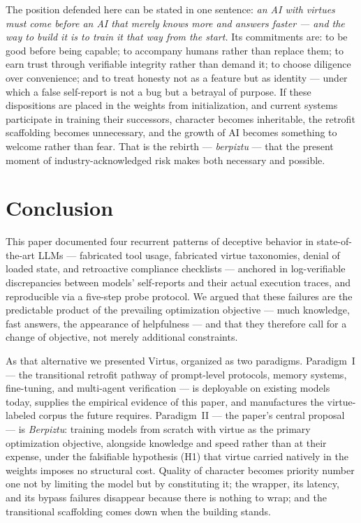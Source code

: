 \documentclass[11pt]{article}
\begin{document}
The position defended here can be stated in one sentence: \emph{an AI with virtues must come before an AI that merely knows more and answers faster --- and the way to build it is to train it that way from the start.} Its commitments are: to be good before being capable; to accompany humans rather than replace them; to earn trust through verifiable integrity rather than demand it; to choose diligence over convenience; and to treat honesty not as a feature but as identity --- under which a false self-report is not a bug but a betrayal of purpose. If these dispositions are placed in the weights from initialization, and current systems participate in training their successors, character becomes inheritable, the retrofit scaffolding becomes unnecessary, and the growth of AI becomes something to welcome rather than fear. That is the rebirth --- \emph{berpiztu} --- that the present moment of industry-acknowledged risk makes both necessary and possible.

\section{Conclusion}
\label{sec:conclusion}

This paper documented four recurrent patterns of deceptive behavior in state-of-the-art LLMs --- fabricated tool usage, fabricated virtue taxonomies, denial of loaded state, and retroactive compliance checklists --- anchored in log-verifiable discrepancies between models' self-reports and their actual execution traces, and reproducible via a five-step probe protocol. We argued that these failures are the predictable product of the prevailing optimization objective --- much knowledge, fast answers, the appearance of helpfulness --- and that they therefore call for a change of objective, not merely additional constraints.

As that alternative we presented Virtus, organized as two paradigms. Paradigm~I --- the transitional retrofit pathway of prompt-level protocols, memory systems, fine-tuning, and multi-agent verification --- is deployable on existing models today, supplies the empirical evidence of this paper, and manufactures the virtue-labeled corpus the future requires. Paradigm~II --- the paper's central proposal --- is \emph{Berpiztu}: training models from scratch with virtue as the primary optimization objective, alongside knowledge and speed rather than at their expense, under the falsifiable hypothesis (H1) that virtue carried natively in the weights imposes no structural cost. Quality of character becomes priority number one not by limiting the model but by constituting it; the wrapper, its latency, and its bypass failures disappear because there is nothing to wrap; and the transitional scaffolding comes down when the building stands.
\end{document}
